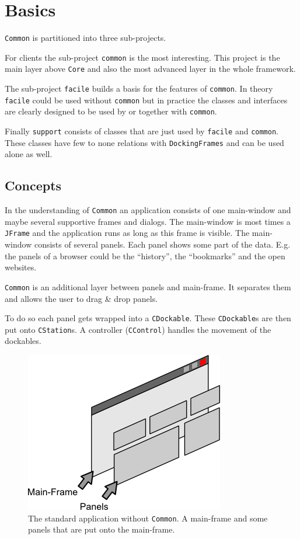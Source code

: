 \documentclass[a4paper,10pt]{article}
\newcommand{\src}[1]{\texttt{#1}}
\begin{document}
\newpage
\section{Basics}
\src{Common} is partitioned into three sub-projects.

For clients the sub-project \src{common} is the most interesting. This project is the main layer above \src{Core} and also the most advanced layer in the whole framework.

The sub-project \src{facile} builds a basis for the features of \src{common}. In theory \src{facile} could be used without \src{common} but in practice the classes and interfaces are clearly designed to be used by or together with \src{common}.

Finally \src{support} consists of classes that are just used by \src{facile} and \src{common}. These classes have few to none relations with \src{DockingFrames} and can be used alone as well.

\subsection{Concepts}
In the understanding of \src{Common} an application consists of one main-window and maybe several supportive frames and dialogs. The main-window is most times a \src{JFrame} and the application runs as long as this frame is visible. The main-window consists of several panels. Each panel shows some part of the data. E.g. the panels of a browser could be the ``history'', the ``bookmarks'' and the open websites.

\src{Common} is an additional layer between panels and main-frame. It separates them and allows the user to drag \& drop panels.

To do so each panel gets wrapped into a \src{CDockable}. These \src{CDockable}s are then put onto \src{CStation}s. A controller (\src{CControl}) handles the movement of the dockables.

\begin{figure}[ht]
\centering
\includegraphics[scale=1]{app_without}
\caption{The standard application without \src{Common}. A main-frame and some panels that are put onto the main-frame.}
\label{fig:app_without}
\end{figure}
\end{document}
